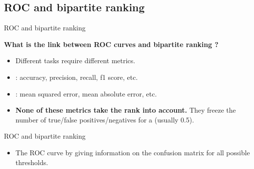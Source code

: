 \subsection{ROC and bipartite ranking}
\begin{frame}{ROC and bipartite ranking}

{\large\textbf{What is the link between ROC curves and bipartite ranking ?}}

\begin{itemize}
    \item Different tasks require different metrics.
    \item {} : accuracy, precision, recall, f1 score, etc.
    \item {} : mean squared error, mean absolute error, etc.
    \item \textbf{None of these metrics take the rank into account.} They freeze the number of true/false positives/negatives for a  (usually 0.5).
    
    \end{itemize} 


\end{frame}


\begin{frame}{ROC and bipartite ranking}

\begin{itemize}
    \item  The ROC curve  by giving information on the confusion matrix for all possible thresholds.
\end{itemize}

\begin{figure}
    \centering
   
    
\end{figure}




\end{frame}




